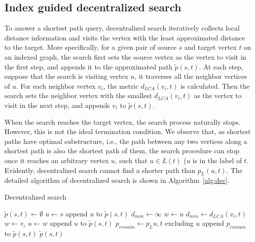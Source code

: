 \subsection{Index guided decentralized search}

To answer a shortest path query, decentralized search iteratively collects local distance information and visits the vertex with the least approximated distance to the target. More specifically, for a given pair of source $s$ and target vertex $t$ on an indexed graph, the search first sets the source vertex as the vertex to visit in the first step, and appends it to the approximated path $\tilde{p}(s,t)$. At each step, suppose that the search is visiting vertex $u$, it traverses all the neighbor vertices of $u$. For each neighbor vertex $v_i$, the metric $d_{LCA}(v_i,t)$ is calculated. Then the search sets the neighbor vertex with the smallest $d_{LCA}(v_i,t)$ as the vertex to visit in the next step, and appends $v_i$ to $\tilde{p}(s,t)$.

When the search reaches the target vertex, the search process naturally stops. However, this is not the ideal termination condition. We observe that, as shortest paths have optimal substructure, i.e., the path between any two vertices along a shortest path is also the shortest path of them, the search procedure can stop once it reaches an arbitrary vertex $u$, such that $u \in L(t)$ ($u$ is in the label of $t$. %
Evidently, decentralized search cannot find a shorter path than $p_L(u,t)$. The detailed algorithm of decentralized search is shown in Algorithm~\ref{alg:dec}.

\begin{algorithm}
    \caption{Decentralized search}
		\label{alg:dec}
    \begin{algorithmic}
						\State $\tilde{p}(s,t) \gets \emptyset$
						\State $u \gets s$
						\State append $u$ to $\tilde{p}(s,t)$
								\State $d_{min} \gets \infty$
								\State $w \gets u$
												\State $d_{min} \gets d_{LCA}(v_i,t)$
												\State $w \gets v_i$
										\EndIf
								\EndFor
								\State $u \gets w$
								\State append $u$ to $\tilde{p}(s,t)$
						\EndWhile
						\State $p_{remain} \gets p_L{u,t}$ excluding $u$
						\State append $p_{remain}$ to $\tilde{p}(s,t)$
						\State \Return $\tilde{p}(s,t)$
        \EndFunction
    \end{algorithmic}
\end{algorithm}

